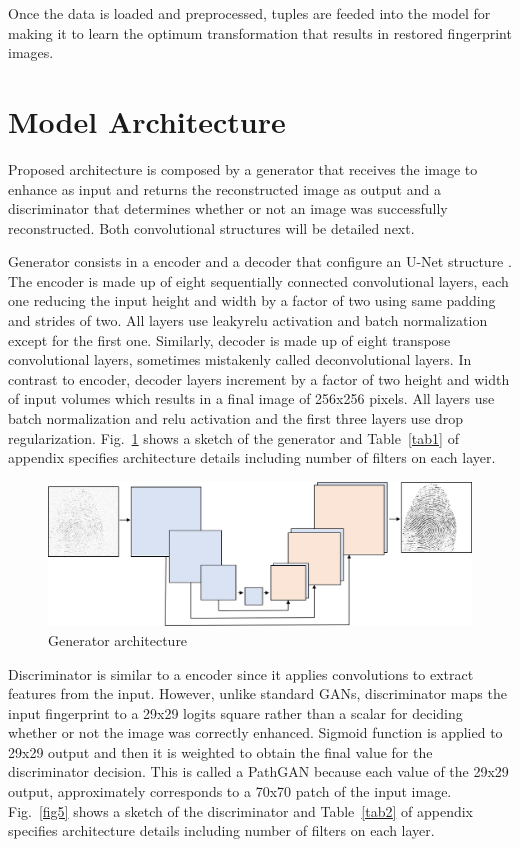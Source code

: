 \documentclass[a4paper,fleqn]{cas-dc}
\begin{document}
Once the data is loaded and preprocessed, tuples are feeded into the model for making it to learn the optimum transformation that results in restored fingerprint images.

\section{Model Architecture}
\label{sec:MA}

Proposed architecture is composed by a generator that receives the image to enhance as input and returns the reconstructed image as output and a discriminator that determines whether or not an image was successfully reconstructed. Both convolutional structures will be detailed next.

Generator consists in a encoder and a decoder that configure an U-Net structure \cite{UNBIS}. The encoder is made up of eight sequentially connected convolutional layers, each one reducing the input height and width by a factor of two using same padding and strides of two. All layers use leakyrelu activation and batch normalization except for the first one. Similarly, decoder is made up of eight transpose convolutional layers, sometimes mistakenly called deconvolutional layers. In contrast to encoder, decoder layers increment by a factor of two height and width of input volumes which results in a final image of 256x256 pixels. All layers use batch normalization and relu activation and the first three layers use drop regularization. Fig.~\ref{fig4} shows a sketch of the generator and Table~\ref{tab1} of appendix specifies architecture details including number of filters on each layer.

\begin{figure}[htbp]
\centerline{\includegraphics[scale=0.37]{figs/generator.png}}
\caption{Generator architecture}
\label{fig4}
\end{figure}

Discriminator is similar to a encoder since it applies convolutions to extract features from the input. However, unlike standard GANs, discriminator maps the input fingerprint to a 29x29 logits square rather than a scalar for deciding whether or not the image was correctly enhanced. Sigmoid function is applied to 29x29 output and then it is weighted to obtain the final value for the discriminator decision. This is called a PathGAN because each value of the 29x29 output, approximately corresponds to a 70x70 patch of the input image. Fig.~\ref{fig5} shows a sketch of the discriminator and Table~\ref{tab2} of appendix specifies architecture details including number of filters on each layer.
\end{document}
